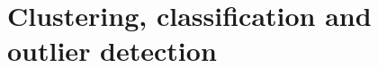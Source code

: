 \chapter{Clustering, classification and outlier detection}\label{ch:clustering_classification_and_outlier_detection}
%
